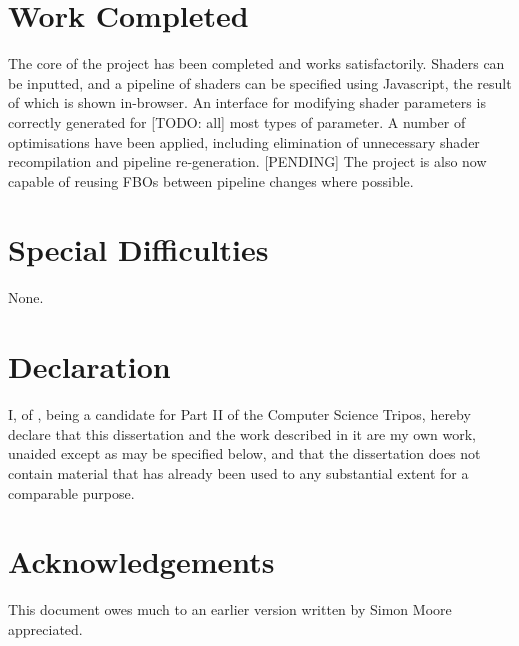 \documentclass[12pt,twoside,notitlepage]{report}
\begin{document}
\section*{Work Completed}
The core of the project has been completed and works satisfactorily. Shaders can be inputted, and a pipeline of shaders can be specified using Javascript, the result of which is shown in-browser. An interface for modifying shader parameters is correctly generated for [TODO: all] most types of parameter. A number of optimisations have been applied, including elimination of unnecessary shader recompilation and pipeline re-generation. [PENDING] The project is also now capable of reusing FBOs between pipeline changes where possible.

\section*{Special Difficulties}
None.
 
\newpage
\section*{Declaration}

I, \name of \college, being a candidate for Part II of the Computer
Science Tripos, hereby declare
that this dissertation and the work described in it are my own work,
unaided except as may be specified below, and that the dissertation
does not contain material that has already been used to any substantial
extent for a comparable purpose.

\bigskip
{}

\medskip
{}

\cleardoublepage

\tableofcontents

\listoffigures

\newpage
\section*{Acknowledgements}

This document owes much to an earlier version written by Simon Moore
appreciated.


\cleardoublepage        %
\end{document}
